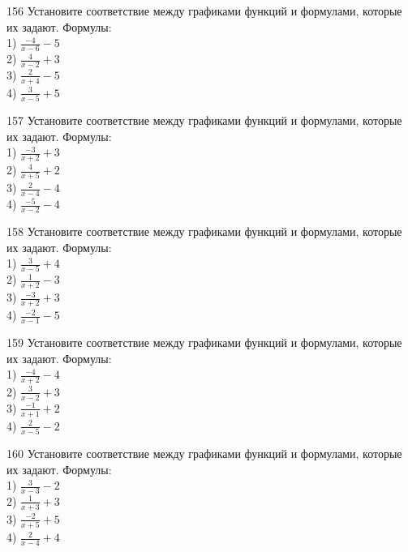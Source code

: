\documentclass[4apaper]{article}
\begin{document}
\begin{taskBN}{156}
Установите соответствие между графиками функций и формулами, которые их задают. Формулы: \\1) $\frac{-4}{x-6}-5$\\2) $\frac{4}{x-2}+3$\\3) $\frac{2}{x+4}-5$\\4) $\frac{3}{x-5}+5$
\end{taskBN}

\begin{taskBN}{157}
Установите соответствие между графиками функций и формулами, которые их задают. Формулы: \\1) $\frac{-3}{x+2}+3$\\2) $\frac{4}{x+5}+2$\\3) $\frac{2}{x-4}-4$\\4) $\frac{-5}{x-2}-4$
\end{taskBN}

\begin{taskBN}{158}
Установите соответствие между графиками функций и формулами, которые их задают. Формулы: \\1) $\frac{3}{x-5}+4$\\2) $\frac{1}{x+2}-3$\\3) $\frac{-3}{x+2}+3$\\4) $\frac{-2}{x-1}-5$
\end{taskBN}

\begin{taskBN}{159}
Установите соответствие между графиками функций и формулами, которые их задают. Формулы: \\1) $\frac{-4}{x+2}-4$\\2) $\frac{3}{x-2}+3$\\3) $\frac{-1}{x+1}+2$\\4) $\frac{2}{x-5}-2$
\end{taskBN}

\begin{taskBN}{160}
Установите соответствие между графиками функций и формулами, которые их задают. Формулы: \\1) $\frac{3}{x-3}-2$\\2) $\frac{1}{x+3}+3$\\3) $\frac{-2}{x+5}+5$\\4) $\frac{2}{x-4}+4$
\end{taskBN}
\end{document}
